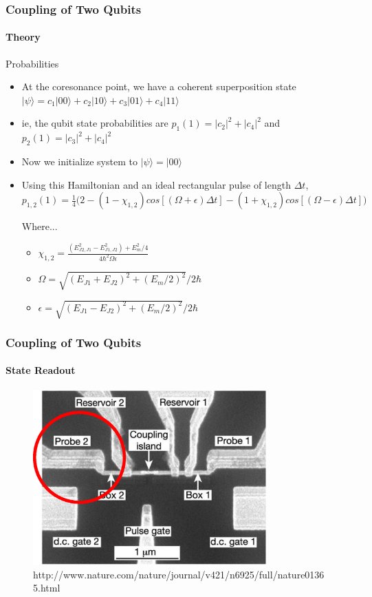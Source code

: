 \documentclass{beamer}
\begin{document}
\begin{frame}
    \frametitle{Coupling of Two Qubits}
    \framesubtitle{Theory}
    \begin{block}{Probabilities}
        \fontsize{8}{14}\selectfont
        \begin{itemize}
            \item At the coresonance point, we have a coherent superposition state $|\psi\rangle=c_1|00\rangle + c_2|10\rangle + c_3|01\rangle + c_4|11\rangle$

            \item ie, the qubit state probabilities are $p_1(1) = |c_2|^2 + |c_4|^2$ and $p_2(1) = |c_3|^2 + |c_4|^2$

            \item Now we initialize system to $|\psi\rangle=|00\rangle$

            \item Using this Hamiltonian and an ideal rectangular pulse of length $\Delta t$, $p_{1,2}(1)=\frac{1}{4} \Bigg ( 2-(1-\chi_{1,2})cos[(\Omega+\epsilon)\Delta t]-(1+\chi_{1,2})cos[(\Omega-\epsilon)\Delta t] \Bigg )$

            Where...
            \begin{itemize}
                \item $\chi_{1,2}=\frac{(E^2_{J2,J1}-E^2_{J1,J2})+E^2_m/4}{4\hbar^2\Omega\epsilon}$
                \item $\Omega = \sqrt{(E_{J1}+E_{J2})^2+(E_m/2)^2}/2\hbar$
                \item $\epsilon = \sqrt{(E_{J1}-E_{J2})^2+(E_m/2)^2}/2\hbar$
            \end{itemize}
        \end{itemize}
    \end{block}
\end{frame}


\begin{frame}
    \frametitle{Coupling of Two Qubits}
    \framesubtitle{State Readout}
    \begin{figure}[!htb]
        \centering
        \includegraphics[width=0.8\textwidth]{img/two-qubit-sem-probe.eps}
        \caption{http://www.nature.com/nature/journal/v421/n6925/full/nature01365.html}
    \end{figure}
\end{frame}
\end{document}

